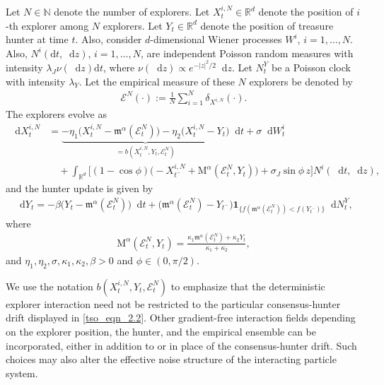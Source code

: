 \documentclass{article}
\def\cE{\mathcal{E}}
\def\m{\mathfrak{m}}
\newcommand*\der{\mathop{}\!\mathrm{d}}
\numberwithin{equation}{section}
\begin{document}
Let $N \in \mathbb{N}$ denote the number of explorers. Let $X^{i, N}_t\in  \mathbb{R}^{d}$ denote the position of $i$-th explorer among $N$ explorers. Let $Y_t \in \mathbb{R}^{d}$ denote the position of treasure hunter at time $t$.  Also, consider $d$-dimensional Wiener processes $W^{i}$, $i=1,\dots,N$. Also, $N^{i}(\mathrm{d}t,\der z)$, $i=1,\dots,N$, are independent Poisson random measures with intensity
$\lambda_J \nu(\der z)\mathrm{d}t$, where $\nu(\der z)\propto e^{-|z|^2/2}\der z$. Let $N^{Y}_t$ be a Poisson clock with intensity $\lambda_Y$.  Let the empirical measure of these $N$ explorers be denoted by 
\begin{align}
    \cE^{N}(\cdot) := \frac{1}{N}\sum\limits_{i=1}^{N}\delta_{X^{i,N}}(\cdot).
\end{align}
The explorers evolve as
\begin{align}\label{tso_eqn_2.2}
\der X_t^{i,N}
&=
\underbrace{-\eta_1\bigl(X_t^{i,N}-\m^\alpha(\mathcal E_t^N)\bigr) -\eta_2\bigl(X_t^{i,N} - Y_t\bigr)}_{=b(X^{i,N}_t, Y_t, \mathcal{E}_t^N)}\der t
+
\sigma \der W_t^i \nonumber 
\\
&\quad+
\int_{\mathbb R^d}
\Big[
(1-\cos\phi)
\bigl(-X_{t^-}^{i,N}+\mathrm{M}^\alpha(\mathcal E_t^N,Y_t)\bigr)
+
\sigma_J\sin\phi\,z
\Big]
N^i(\der t,\der z),
\end{align}
and the hunter update is given by 
\begin{align}\label{tso_eqn_2.3}
    \der Y_t
    = -\beta\bigl(Y_t - \mathfrak{m}^\alpha(\cE_t^N)\bigr)\der t +
    \bigl(\mathfrak{m}^\alpha(\cE_t^N)-Y_{t^-}\bigr)
    \mathbf 1_{\{f(\mathfrak{m}^\alpha(\mathcal{E}_t^N))<f(Y_{t^-})\}}
    \der N_t^Y,
\end{align} 
where 
\begin{align}\label{tso_eqn_2.4}
\mathrm{M}^\alpha(\mathcal E_t^N,Y_t) =     \frac{\kappa_1 \mathfrak{m}^\alpha(\mathcal E_t^N)+\kappa_2Y_t}{\kappa_1+\kappa_2},
\end{align}
 and $\eta_1, \eta_2, \sigma, \kappa_1, \kappa_2, \beta >0$ and  $\phi\in(0,\pi/2)$.  


We use the notation
$b(X_t^{i,N},Y_t,\mathcal E_t^N)$ to emphasize that the deterministic explorer interaction need not be restricted to the
particular consensus-hunter drift displayed in \eqref{tso_eqn_2.2}. Other gradient-free interaction fields depending on the explorer position,
the hunter, and the empirical ensemble can be incorporated, either in
addition to or in place of the consensus-hunter drift. Such choices may also alter
the effective noise structure of the interacting particle system. 
\end{document}
